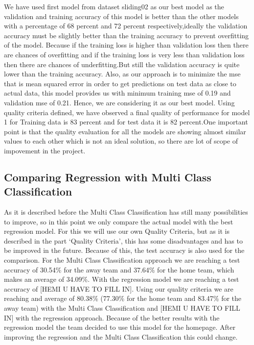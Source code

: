 We have used first model from dataset sliding02 as our best model as the  validation and training accuracy of this model is better than the other models with a percentage of 68 percent and 72 percent respectively,ideally the validation accuracy must be slightly better than the training accuracy to prevent overfitting of the model. Because if the training loss is higher than validation loss then there are chances of overfitting and if the training loss is very less than validation loss then there are chances of underfitting.But still the validation accuracy is quite lower than the training accuracy.\newline
Also, as our approach is to minimize the mse that is mean squared error in order to get predictions on test data as close to actual data, this model provides us with minimum training mse of 0.19 and validation mse of 0.21. Hence, we are considering it as our best model.\newline
Using quality criteria defined, we have observed a final quality of performance for model 1 for Training data is 83 percent and for test data it is 82 percent.One important point is that the quality evaluation for all the models are showing almost similar values to each other which is not an ideal solution, so there are lot of scope of impovement in the project.\newline

\subsection{Comparing Regression with Multi Class Classification}
As it is described before the Multi Class Classification has still many possibilities to improve, so in this point we only compare the actual model with the best regression model. For this we will use our own Quality Criteria, but as it is described in the part `Quality Criteria', this has some disadvantages and has to be improved in the future. Because of this, the test accuracy is also used for the comparison. For the Multi Class Classification approach we are reaching a test accuracy of 30.54\% for the away team and 37.64\% for the home team, which makes an average of 34.09\%. With the regression model we are reaching a test accuracy of [HEMI U HAVE TO FILL IN]. Using our quality criteria we are reaching and average of  80.38\% (77.30\% for the home team and 83.47\% for the away team) with the Multi Class Classification and [HEMI U HAVE TO FILL IN] with the regression approach. Because of the better results with the regression model the team decided to use this model for the homepage. After improving the regression and the Multi Class Classification this could change. 